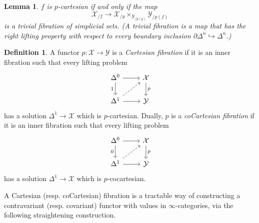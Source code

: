 \documentclass[11pt]{article}
\newtheorem{lemma}{Lemma}
\theoremstyle{definition}
\newtheorem{definition}{Definition}
\newcommand{\X}{\mathcal{X}}
\newcommand{\Y}{\mathcal{Y}}
\begin{document}
\begin{lemma}
    $f$ is $p$-cartesian if and only if the map
    \[
        \X_{/f} \to \X_{/y} \times_{\Y_{/p(y)}} \Y_{/p(f)}
    \]
    is a trivial fibration of simplicial sets.
    (A trivial fibration is a map that has the right lifting property with respect to every boundary inclusion $\partial \Delta^n \hookrightarrow \Delta^n$.)
\end{lemma}

\begin{definition}
    A functor $p : \X \to \Y$ is a \emph{Cartesian fibration} if it is an inner fibration such that every lifting problem
    \[\begin{tikzcd}
        {\Delta^0} & \X \\
        {\Delta^1} & \Y
        \arrow[from=1-1, to=1-2]
        \arrow["1"', from=1-1, to=2-1]
        \arrow["p", from=1-2, to=2-2]
        \arrow[dashed, from=2-1, to=1-2]
        \arrow[from=2-1, to=2-2]
    \end{tikzcd}\]
    has a solution $\Delta^1 \to \X$ which is $p$-cartesian.
    Dually, $p$ is a \emph{coCartesian fibration} if it is an inner fibration such that every lifting problem
    \[\begin{tikzcd}
        {\Delta^0} & \X \\
        {\Delta^1} & \Y
        \arrow[from=1-1, to=1-2]
        \arrow["0"', from=1-1, to=2-1]
        \arrow["p", from=1-2, to=2-2]
        \arrow[dashed, from=2-1, to=1-2]
        \arrow[from=2-1, to=2-2]
    \end{tikzcd}\]
    has a solution $\Delta^1 \to \X$ which is $p$-cocartesian.
\end{definition}

A Cartesian (resp. coCartesian) fibration is a tractable way of constructing a contravariant (resp. covariant) functor with values in $\infty$-categories, via the following straightening construction.
\end{document}
